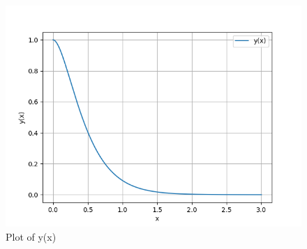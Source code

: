 \documentclass[journal,12pt,twocolumn]{IEEEtran}
\theoremstyle{remark}
\begin{document}
\begin{figure}
    \centering
    \includegraphics[width=1\linewidth]{figure.png}
        \caption{Plot of y(x)}
    \label{fig:enter-label}
\end{figure}
\end{document}
